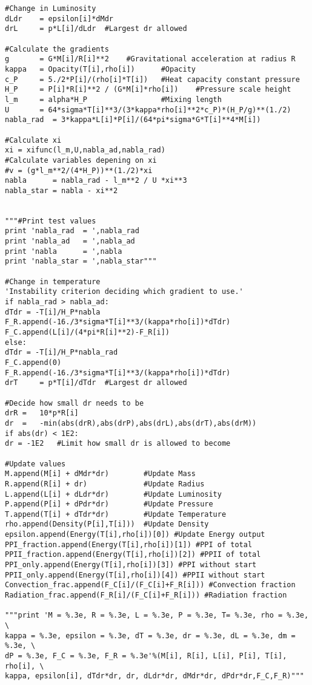 \documentclass[a4paper,12pt]{article}
\begin{document}
\begin{verbatim}
#Change in Luminosity
dLdr 	= epsilon[i]*dMdr
drL 	= p*L[i]/dLdr  #Largest dr allowed

#Calculate the gradients
g       = G*M[i]/R[i]**2    #Gravitational acceleration at radius R
kappa   = Opacity(T[i],rho[i])		#Opacity
c_P     = 5./2*P[i]/(rho[i]*T[i])	#Heat capacity constant pressure
H_P     = P[i]*R[i]**2 / (G*M[i]*rho[i])	#Pressure scale height
l_m     = alpha*H_P	                #Mixing length
U       = 64*sigma*T[i]**3/(3*kappa*rho[i]**2*c_P)*(H_P/g)**(1./2)
nabla_rad  = 3*kappa*L[i]*P[i]/(64*pi*sigma*G*T[i]**4*M[i])

#Calculate xi
xi = xifunc(l_m,U,nabla_ad,nabla_rad)
#Calculate variables depening on xi
#v = (g*l_m**2/(4*H_P))**(1./2)*xi
nabla      = nabla_rad - l_m**2 / U *xi**3
nabla_star = nabla - xi**2


"""#Print test values
print 'nabla_rad  = ',nabla_rad
print 'nabla_ad   = ',nabla_ad
print 'nabla      = ',nabla
print 'nabla_star = ',nabla_star"""

#Change in temperature    
'Instability criterion deciding which gradient to use.'
if nabla_rad > nabla_ad:
dTdr = -T[i]/H_P*nabla
F_R.append(-16./3*sigma*T[i]**3/(kappa*rho[i])*dTdr)
F_C.append(L[i]/(4*pi*R[i]**2)-F_R[i])
else:
dTdr = -T[i]/H_P*nabla_rad
F_C.append(0)
F_R.append(-16./3*sigma*T[i]**3/(kappa*rho[i])*dTdr)
drT 	= p*T[i]/dTdr  #Largest dr allowed

#Decide how small dr needs to be
drR =   10*p*R[i]
dr  =   -min(abs(drR),abs(drP),abs(drL),abs(drT),abs(drM))
if abs(dr) < 1E2:
dr = -1E2   #Limit how small dr is allowed to become

#Update values
M.append(M[i] + dMdr*dr)		#Update Mass
R.append(R[i] + dr)     		#Update Radius
L.append(L[i] + dLdr*dr) 		#Update Luminosity
P.append(P[i] + dPdr*dr)		#Update Pressure
T.append(T[i] + dTdr*dr)		#Update Temperature
rho.append(Density(P[i],T[i]))	#Update Density
epsilon.append(Energy(T[i],rho[i])[0]) #Update Energy output
PPI_fraction.append(Energy(T[i],rho[i])[1]) #PPI of total
PPII_fraction.append(Energy(T[i],rho[i])[2]) #PPII of total
PPI_only.append(Energy(T[i],rho[i])[3]) #PPI without start
PPII_only.append(Energy(T[i],rho[i])[4]) #PPII without start
Convection_frac.append(F_C[i]/(F_C[i]+F_R[i])) #Convection fraction
Radiation_frac.append(F_R[i]/(F_C[i]+F_R[i])) #Radiation fraction

"""print 'M = %.3e, R = %.3e, L = %.3e, P = %.3e, T= %.3e, rho = %.3e, \
kappa = %.3e, epsilon = %.3e, dT = %.3e, dr = %.3e, dL = %.3e, dm = %.3e, \
dP = %.3e, F_C = %.3e, F_R = %.3e'%(M[i], R[i], L[i], P[i], T[i], rho[i], \
kappa, epsilon[i], dTdr*dr, dr, dLdr*dr, dMdr*dr, dPdr*dr,F_C,F_R)"""


\end{verbatim}
\end{document}
